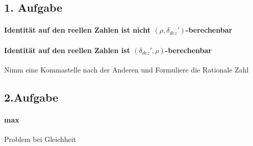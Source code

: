 \documentclass[ngerman]{scrartcl}
\begin{document}
\subsection*{1. Aufgabe}
\paragraph{Identität auf den reellen Zahlen ist nicht $ (\rho, \delta_{dez}') $-berechenbar} 
\paragraph{Identität auf den reellen Zahlen ist $ (\delta_{dez}', \rho) $-berechenbar} Nimm eine Kommastelle nach der Anderen und Formuliere die Rationale Zahl

\subsection*{2.Aufgabe} 
\paragraph{max} Problem bei Gleichheit
\end{document}
